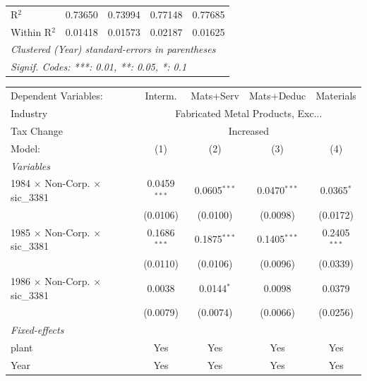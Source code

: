 \documentclass[
  12pt]{article}
\theoremstyle{definition}
\theoremstyle{remark}
\begin{document}
\begin{table}
\begin{minipage}{\linewidth}
\begin{tabular}{lcccc}
   R$^2$                                         & 0.73650        & 0.73994        & 0.77148        & 0.77685\\  
   Within R$^2$                                  & 0.01418        & 0.01573        & 0.02187        & 0.01625\\  
   \midrule \midrule
   \multicolumn{5}{l}{\emph{Clustered (Year) standard-errors in parentheses}}\\
   \multicolumn{5}{l}{\emph{Signif. Codes: ***: 0.01, **: 0.05, *: 0.1}}\\
\end{tabular}
\par\endgroup
\begingroup
\centering
\begin{tabular}{lcccc}
   \tabularnewline \midrule \midrule
   Dependent Variables:                          & Interm.        & Mats+Serv      & Mats+Deduc     & Materials\\  
   Industry & \multicolumn{4}{c}{Fabricated Metal Products, Exc...} \\ 
   Tax Change & \multicolumn{4}{c}{Increased} \\ 
   Model:                                        & (1)            & (2)            & (3)            & (4)\\  
   \midrule
   \emph{Variables}\\
   1984 $\times$ Non-Corp. $\times$ sic\_3381    & 0.0459$^{***}$ & 0.0605$^{***}$ & 0.0470$^{***}$ & 0.0365$^{*}$\\   
                                                 & (0.0106)       & (0.0100)       & (0.0098)       & (0.0172)\\   
   1985 $\times$ Non-Corp. $\times$ sic\_3381    & 0.1686$^{***}$ & 0.1875$^{***}$ & 0.1405$^{***}$ & 0.2405$^{***}$\\   
                                                 & (0.0110)       & (0.0106)       & (0.0096)       & (0.0339)\\   
   1986 $\times$ Non-Corp. $\times$ sic\_3381    & 0.0038         & 0.0144$^{*}$   & 0.0098         & 0.0379\\   
                                                 & (0.0079)       & (0.0074)       & (0.0066)       & (0.0256)\\   
   \midrule
   \emph{Fixed-effects}\\
   plant                                         & Yes            & Yes            & Yes            & Yes\\  
   Year                                          & Yes            & Yes            & Yes            & Yes\\  

\end{tabular}
\end{minipage}
\end{table}
\end{document}
